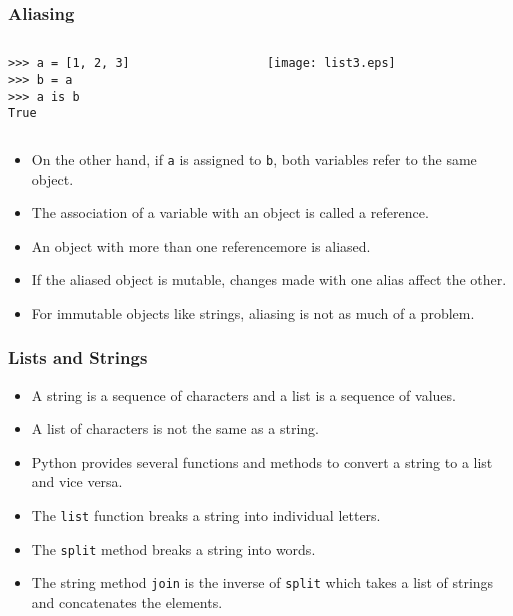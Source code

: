 \documentclass{beamer}
\newcommand{\beforeverb}{\footnotesize}
\newcommand{\afterverb}{\normalsize}
\begin{document}
\begin{frame}[fragile]
\frametitle{Aliasing}
\begin{columns}
\begin{column}{0.4\textwidth}
\begin{block}{}
\beforeverb
\begin{verbatim}
>>> a = [1, 2, 3]
>>> b = a
>>> a is b
True
\end{verbatim}
\afterverb
\end{block}
\end{column}
\begin{column}{0.4\textwidth}
\centerline{\texttt{[image: list3.eps]}}
\end{column}
\end{columns}
\vspace{0.4cm}

\begin{itemize}
\item On the other hand, if {\tt a} is \alert{assigned} to {\tt b}, both variables refer to the \alert{same} object. 
\item The association of a variable with an object is called a \alert{reference}. 
\item An object with more than one referencemore is \alert{aliased}.
\item If the aliased object is \alert{mutable}, 
changes made with one alias affect
the other.
\item For immutable objects like strings, aliasing is not as much of a
problem. 
\end{itemize}

\end{frame}

\begin{frame}[fragile]
\frametitle{Lists and Strings}

\begin{itemize}

\item A string is a sequence of \alert{characters} and a list is a sequence
of \alert{values}.
\item A list of characters is \alert{not the same} as a
string.  
\item 
Python provides several functions and methods to convert a string to a list and vice versa.
\item The {\tt list} function breaks a string into individual letters.

\item  The {\tt split} method breaks a string into words.
\item 
The string method {\tt join} is the inverse of {\tt split} which takes a list of strings and
concatenates the elements.  
\end{itemize}
\end{frame}
\end{document}
